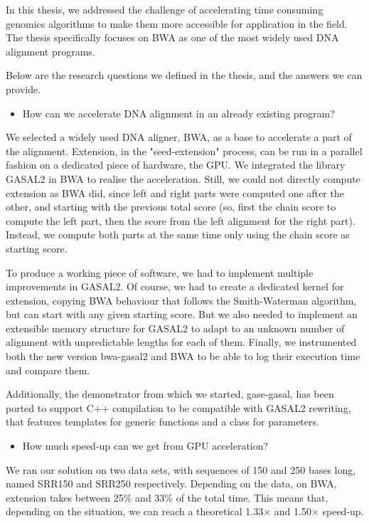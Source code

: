 

In this thesis, we addressed the challenge of accelerating time consuming genomics algorithms to make them more accessible for application in the field. The thesis specifically focuses on BWA as one of the most widely used DNA alignment programs. 

Below are the research questions we defined in the thesis, and the answers we can provide.

\begin{itemize}
	\item How can we accelerate DNA alignment in an already existing program?
\end{itemize}	

We selected a widely used DNA aligner, BWA, as a base to accelerate a part of the alignment. Extension, in the "seed-extension" process, can be run in a parallel fashion on a dedicated piece of hardware, the GPU. We integrated the library GASAL2 in BWA to realise the acceleration. Still, we could not directly compute extension as BWA did, since left and right parts were computed one after the other, and starting with the previous total score (so, first the chain score to compute the left part, then the score from the left alignment for the right part). Instead, we compute both parts at the same time only using the chain score as starting score.

To produce a working piece of software, we had to implement multiple improvements in GASAL2. Of course, we had to create a dedicated kernel for extension, copying BWA behaviour that follows the Smith-Waterman algorithm, but can start with any given starting score. But we also needed to implement an extensible memory structure for GASAL2 to adapt to an unknown number of alignment with unpredictable lengths for each of them. Finally, we instrumented both the new version bwa-gasal2 and BWA to be able to log their execution time and compare them. 

Additionally, the demonstrator from which we started, gase-gasal, has been ported to support C++ compilation to be compatible with GASAL2 rewriting, that features templates for generic functions and a class for parameters.

\begin{itemize}
	\item How much speed-up can we get from GPU acceleration?
\end{itemize}

We ran our solution on two data sets, with sequences of 150 and 250 bases long, named SRR150 and SRR250 respectively. Depending on the data, on BWA, extension takes between 25\% and 33\% of the total time. This means that, depending on the situation, we can reach a theoretical 1.33$\times$ and 1.50$\times$ speed-up.

